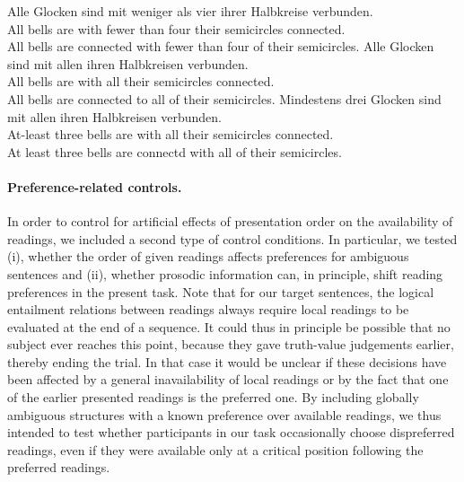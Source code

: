 \documentclass[fleqn,reqno,10pt,draft]{article}
\begin{document}
\begin{exe}
\ex \label{bsp:controls-es}
  \begin{xlist}
\ex \label{bsp:controls-es-1} \gll Alle Glocken sind mit weniger als
  vier ihrer Halbkreise verbunden. \\ 
All bells are with fewer than four their semicircles connected.\\
\trans All bells are connected with fewer than four of their semicircles.  
\ex \label{bsp:controls-es-2} \gll Alle Glocken sind mit allen ihren Halbkreisen verbunden.\\
All bells are with all their semicircles connected.\\
\trans All bells are connected to all of their semicircles. 
\ex \label{bsp:controls-es-3} \gll Mindestens drei Glocken sind mit
  allen ihren Halbkreisen verbunden.\\ 
  At-least three bells are with all  their semicircles connected.\\
  \trans At least three bells are connectd with all of their semicircles.
\end{xlist}
\end{exe}



\paragraph{Preference-related controls.} In order to control for
artificial effects of presentation order on the availability of
readings, we included a second type of control conditions. In
particular, we tested (i), whether the order of given readings affects
preferences for ambiguous sentences and (ii), whether prosodic
information can, in principle, shift reading preferences in the
present task. Note that for our target sentences, the logical
entailment relations between readings always require local readings to
be evaluated at the end of a sequence. It could thus in principle be
possible that no subject ever reaches this point, because they gave
truth-value judgements earlier, thereby ending the trial. In that case
it would be unclear if these decisions have been affected by a general
inavailability of local readings or by the fact that one of the
earlier presented readings is the preferred one. By including globally
ambiguous structures with a known preference over available readings,
we thus intended to test whether participants in our task occasionally
choose dispreferred readings, even if they were available only at a critical
position following the preferred readings.
\end{document}
